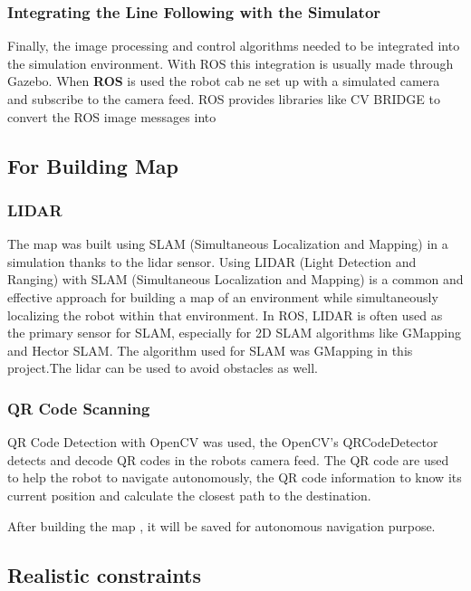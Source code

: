 \documentclass[../../main]{subfiles}
\begin{document}
    \subsubsection{Integrating the Line Following with the Simulator}
    
    Finally, the image processing and control algorithms needed to be
    integrated into the simulation environment. With ROS this integration is
    usually made through Gazebo. When \textbf{ROS} is used the robot cab ne
    set up with a simulated camera and subscribe to the camera feed. ROS
    provides libraries like CV BRIDGE to convert the ROS image messages into
    
    \subsection{For Building Map}
    
    \subsubsection{LIDAR}
    
    The map was built using SLAM (Simultaneous Localization and Mapping) in
    a simulation thanks to the lidar sensor. Using LIDAR (Light Detection
    and Ranging) with SLAM (Simultaneous Localization and Mapping) is a
    common and effective approach for building a map of an environment while
    simultaneously localizing the robot within that environment. In ROS,
    LIDAR is often used as the primary sensor for SLAM, especially for 2D
    SLAM algorithms like GMapping and Hector SLAM. The algorithm used for
    SLAM was GMapping in this project.The lidar can be used to avoid
    obstacles as well.
    
    \subsubsection{QR Code Scanning}
    
    QR Code Detection with OpenCV was used, the OpenCV's QRCodeDetector
    detects and decode QR codes in the robot\textquotesingle s camera feed.
    The QR code are used to help the robot to navigate autonomously, the QR
    code information to know its current position and calculate the closest
    path to the destination.
    
    After building the map , it will be saved for autonomous navigation
    purpose.
    
      \subsection{Realistic constraints}
    
\end{document}
